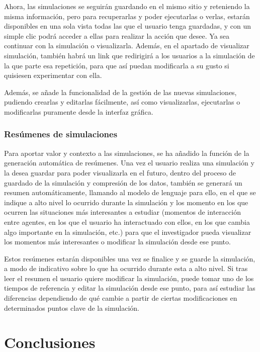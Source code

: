 Ahora, las simulaciones se seguirán guardando en el mismo sitio y reteniendo la misma información, pero para recuperarlas y poder ejecutarlas o verlas, estarán disponibles en una sola vista todas las que el usuario tenga guardadas, y con un simple clic podrá acceder a ellas para realizar la acción que desee. Ya sea continuar con la simulación o visualizarla. Además, en el apartado de visualizar simulación, también habrá un link que redirigirá a los usuarios a la simulación de la que parte esa repetición, para que así puedan modificarla a su gusto si quisiesen experimentar con ella.

Además, se añade la funcionalidad de la gestión de las nuevas simulaciones, pudiendo crearlas y editarlas fácilmente, así como visualizarlas, ejecutarlas o modificarlas puramente desde la interfaz gráfica.

\subsubsection{Resúmenes de simulaciones}

Para aportar valor y contexto a las simulaciones, se ha añadido la función de la generación automática de resúmenes. Una vez el usuario realiza una simulación y la desea guardar para poder visualizarla en el futuro, dentro del proceso de guardado de la simulación y compresión de los datos, también se generará un resumen automáticamente, llamando al modelo de lenguaje para ello, en el que se indique a alto nivel lo ocurrido durante la simulación y los momento en los que ocurren las situaciones más interesantes a estudiar (momentos de interacción entre agentes, en los que el usuario ha interactuado con ellos, en los que cambia algo importante en la simulación, etc.) para que el investigador pueda visualizar los momentos más interesantes o modificar la simulación desde ese punto.

Estos resúmenes estarán disponibles una vez se finalice y se guarde la simulación, a modo de indicativo sobre lo que ha ocurrido durante esta a alto nivel. Si tras leer el resumen el usuario quiere modificar la simulación, puede tomar uno de los tiempos de referencia y editar la simulación desde ese punto, para así estudiar las diferencias dependiendo de qué cambie a partir de ciertas modificaciones en determinados puntos clave de la simulación.\\

\section{Conclusiones}

